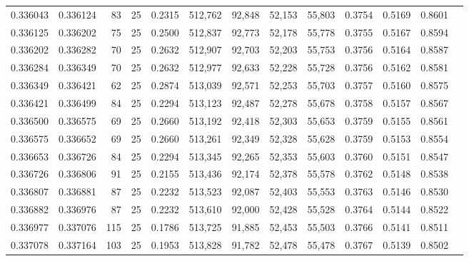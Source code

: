 \begin{tabular}{rrrrrrrrrrrrr}
0.336043 & 0.336124 &    83 &  25 &                                     0.2315 & 512,762 &  92,848 &  52,153 &  55,803 & 0.3754 & 0.5169 & 0.8601 \\
0.336125 & 0.336202 &    75 &  25 &                                     0.2500 & 512,837 &  92,773 &  52,178 &  55,778 & 0.3755 & 0.5167 & 0.8594 \\
0.336202 & 0.336282 &    70 &  25 &                                     0.2632 & 512,907 &  92,703 &  52,203 &  55,753 & 0.3756 & 0.5164 & 0.8587 \\
0.336284 & 0.336349 &    70 &  25 &                                     0.2632 & 512,977 &  92,633 &  52,228 &  55,728 & 0.3756 & 0.5162 & 0.8581 \\
0.336349 & 0.336421 &    62 &  25 &                                     0.2874 & 513,039 &  92,571 &  52,253 &  55,703 & 0.3757 & 0.5160 & 0.8575 \\
0.336421 & 0.336499 &    84 &  25 &                                     0.2294 & 513,123 &  92,487 &  52,278 &  55,678 & 0.3758 & 0.5157 & 0.8567 \\
0.336500 & 0.336575 &    69 &  25 &                                     0.2660 & 513,192 &  92,418 &  52,303 &  55,653 & 0.3759 & 0.5155 & 0.8561 \\
0.336575 & 0.336652 &    69 &  25 &                                     0.2660 & 513,261 &  92,349 &  52,328 &  55,628 & 0.3759 & 0.5153 & 0.8554 \\
0.336653 & 0.336726 &    84 &  25 &                                     0.2294 & 513,345 &  92,265 &  52,353 &  55,603 & 0.3760 & 0.5151 & 0.8547 \\
0.336726 & 0.336806 &    91 &  25 &                                     0.2155 & 513,436 &  92,174 &  52,378 &  55,578 & 0.3762 & 0.5148 & 0.8538 \\
0.336807 & 0.336881 &    87 &  25 &                                     0.2232 & 513,523 &  92,087 &  52,403 &  55,553 & 0.3763 & 0.5146 & 0.8530 \\
0.336882 & 0.336976 &    87 &  25 &                                     0.2232 & 513,610 &  92,000 &  52,428 &  55,528 & 0.3764 & 0.5144 & 0.8522 \\
0.336977 & 0.337076 &   115 &  25 &                                     0.1786 & 513,725 &  91,885 &  52,453 &  55,503 & 0.3766 & 0.5141 & 0.8511 \\
0.337078 & 0.337164 &   103 &  25 &                                     0.1953 & 513,828 &  91,782 &  52,478 &  55,478 & 0.3767 & 0.5139 & 0.8502 \\

\end{tabular}
